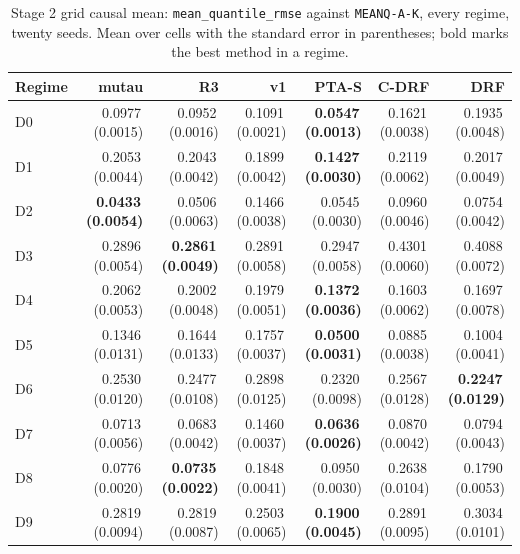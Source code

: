 \begin{table}[htbp]
\centering
\caption{Stage 2 grid causal mean: \texttt{mean\_quantile\_rmse} against \texttt{MEANQ-A-K}, every regime, twenty seeds. Mean over cells with the standard error in parentheses; bold marks the best method in a regime.}
\label{tab:p55s2-meanq}
\scriptsize
\setlength{\tabcolsep}{3.2pt}
\begin{tabular}{@{}lrrrrrr@{}}
\toprule
Regime & mutau & R3 & v1 & PTA-S & C-DRF & DRF \\
\midrule
D0 & 0.0977\,(0.0015) & 0.0952\,(0.0016) & 0.1091\,(0.0021) & \textbf{0.0547\,(0.0013)} & 0.1621\,(0.0038) & 0.1935\,(0.0048) \\
D1 & 0.2053\,(0.0044) & 0.2043\,(0.0042) & 0.1899\,(0.0042) & \textbf{0.1427\,(0.0030)} & 0.2119\,(0.0062) & 0.2017\,(0.0049) \\
D2 & \textbf{0.0433\,(0.0054)} & 0.0506\,(0.0063) & 0.1466\,(0.0038) & 0.0545\,(0.0030) & 0.0960\,(0.0046) & 0.0754\,(0.0042) \\
D3 & 0.2896\,(0.0054) & \textbf{0.2861\,(0.0049)} & 0.2891\,(0.0058) & 0.2947\,(0.0058) & 0.4301\,(0.0060) & 0.4088\,(0.0072) \\
D4 & 0.2062\,(0.0053) & 0.2002\,(0.0048) & 0.1979\,(0.0051) & \textbf{0.1372\,(0.0036)} & 0.1603\,(0.0062) & 0.1697\,(0.0078) \\
D5 & 0.1346\,(0.0131) & 0.1644\,(0.0133) & 0.1757\,(0.0037) & \textbf{0.0500\,(0.0031)} & 0.0885\,(0.0038) & 0.1004\,(0.0041) \\
D6 & 0.2530\,(0.0120) & 0.2477\,(0.0108) & 0.2898\,(0.0125) & 0.2320\,(0.0098) & 0.2567\,(0.0128) & \textbf{0.2247\,(0.0129)} \\
D7 & 0.0713\,(0.0056) & 0.0683\,(0.0042) & 0.1460\,(0.0037) & \textbf{0.0636\,(0.0026)} & 0.0870\,(0.0042) & 0.0794\,(0.0043) \\
D8 & 0.0776\,(0.0020) & \textbf{0.0735\,(0.0022)} & 0.1848\,(0.0041) & 0.0950\,(0.0030) & 0.2638\,(0.0104) & 0.1790\,(0.0053) \\
D9 & 0.2819\,(0.0094) & 0.2819\,(0.0087) & 0.2503\,(0.0065) & \textbf{0.1900\,(0.0045)} & 0.2891\,(0.0095) & 0.3034\,(0.0101) \\
\bottomrule
\end{tabular}
\end{table}


